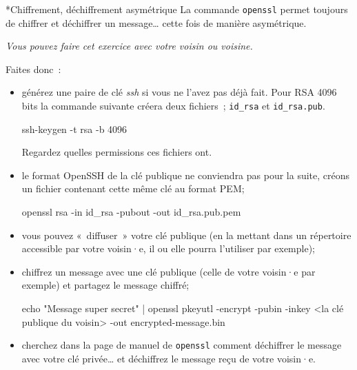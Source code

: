\documentclass[a4paper,11pt]{article}
\begin{document}
\begin{Exercice}*{Chiffrement, déchiffrement asymétrique}
	La commande \texttt{openssl} permet toujours de chiffrer et déchiffrer un 
	message… cette fois de manière asymétrique. 

	\textit{Vous pouvez faire cet exercice avec votre voisin ou voisine.}

	
	Faites donc~:

	\begin{itemize}
		
		\item générez une paire de clé \textit{ssh} si vous ne l'avez pas déjà
			fait. Pour RSA 4096 bits la commande suivante créera deux fichiers~;
			\texttt{id\_rsa} et \texttt{id\_rsa.pub}.

			\begin{term}
				ssh-keygen -t rsa -b 4096
			\end{term}

			Regardez quelles permissions ces fichiers ont. 

		\item le format OpenSSH de la clé publique ne conviendra pas pour la
			suite, créons un fichier contenant cette même clé au format PEM;

			\begin{term}
				openssl rsa -in id\_rsa -pubout -out id\_rsa.pub.pem
			\end{term}

		\item vous pouvez «~diffuser~» votre clé publique  (en la mettant dans 
			un répertoire accessible par votre voisin·e, il ou elle pourra 
			l'utiliser par exemple); 

		\item chiffrez un message avec une clé publique (celle de votre voisin·e
			par exemple) et partagez le message chiffré;

			\begin{term}
				echo "Message super secret" 
				    | openssl pkeyutl -encrypt -pubin 
				        -inkey <la clé publique du voisin> 
				        -out encrypted-message.bin
			\end{term}

		\item cherchez dans la page de manuel de \texttt{openssl} comment 
			déchiffrer le message avec votre clé privée… et déchiffrez le 
			message reçu de votre voisin·e. 

	\end{itemize}

\end{Exercice}
\end{document}
